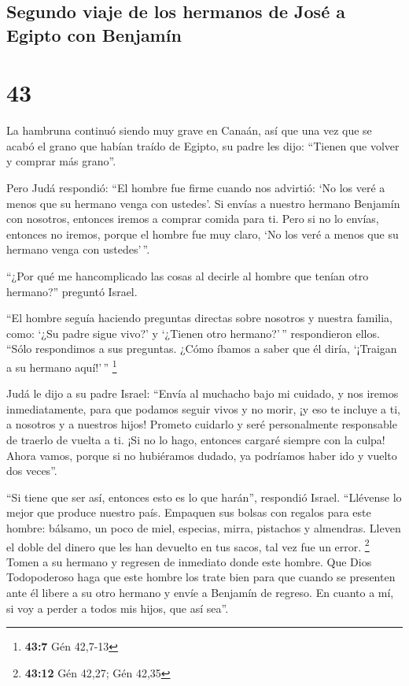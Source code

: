 \hypertarget{segundo-viaje-de-los-hermanos-de-josuxe9-a-egipto-con-benjamuxedn}{%
\subsection{Segundo viaje de los hermanos de José a Egipto con
Benjamín}\label{segundo-viaje-de-los-hermanos-de-josuxe9-a-egipto-con-benjamuxedn}}

\hypertarget{section-42}{%
\section{43}\label{section-42}}

 La hambruna continuó siendo muy grave en Canaán,
 así que una vez que se acabó el grano que habían traído
de Egipto, su padre les dijo: ``Tienen que volver y comprar más grano''.

 Pero Judá respondió: ``El hombre fue firme cuando nos
advirtió: `No los veré a menos que su hermano venga con ustedes'.
 Si envías a nuestro hermano Benjamín con nosotros,
entonces iremos a comprar comida para ti.  Pero si no lo
envías, entonces no iremos, porque el hombre fue muy claro, `No los veré
a menos que su hermano venga con ustedes'\,''.

 ``¿Por qué me hancomplicado las cosas al decirle al
hombre que tenían otro hermano?'' preguntó Israel.

 ``El hombre seguía haciendo preguntas directas sobre
nosotros y nuestra familia, como: `¿Su padre sigue vivo?' y `¿Tienen
otro hermano?'\,'' respondieron ellos. ``Sólo respondimos a sus
preguntas. ¿Cómo íbamos a saber que él diría, `¡Traigan a su hermano
aquí!'\,'' \footnote{\textbf{43:7} Gén 42,7-13}

 Judá le dijo a su padre Israel: ``Envía al muchacho bajo
mi cuidado, y nos iremos inmediatamente, para que podamos seguir vivos y
no morir, ¡y eso te incluye a ti, a nosotros y a nuestros hijos!
 Prometo cuidarlo y seré personalmente responsable de
traerlo de vuelta a ti. ¡Si no lo hago, entonces cargaré siempre con la
culpa!  Ahora vamos, porque si no hubiéramos dudado, ya
podríamos haber ido y vuelto dos veces''.

 ``Si tiene que ser así, entonces esto es lo que harán'',
respondió Israel. ``Llévense lo mejor que produce nuestro país. Empaquen
sus bolsas con regalos para este hombre: bálsamo, un poco de miel,
especias, mirra, pistachos y almendras.  Lleven el doble
del dinero que les han devuelto en tus sacos, tal vez fue un error.
\footnote{\textbf{43:12} Gén 42,27; Gén 42,35}  Tomen a
su hermano y regresen de inmediato donde este hombre. 
Que Dios Todopoderoso haga que este hombre los trate bien para que
cuando se presenten ante él libere a su otro hermano y envíe a Benjamín
de regreso. En cuanto a mí, si voy a perder a todos mis hijos, que así
sea''.

